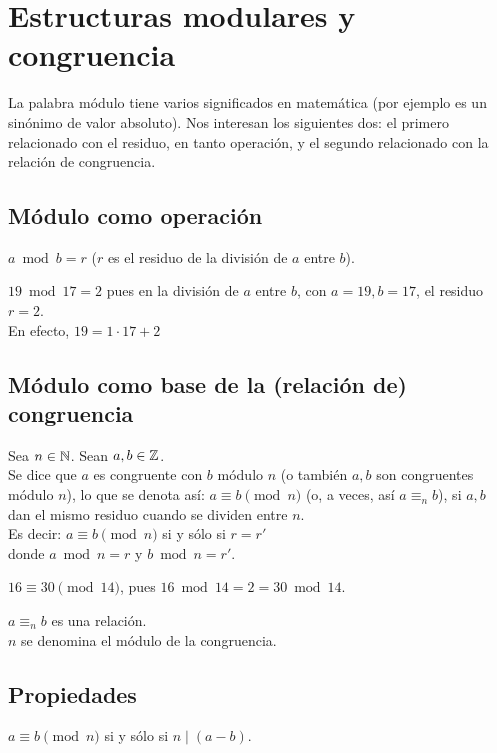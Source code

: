\section{Estructuras modulares y congruencia}
La palabra módulo tiene varios significados en matemática (por ejemplo es un sinónimo de valor absoluto).
Nos interesan los siguientes dos: el primero relacionado con el residuo, en tanto operación, y el segundo relacionado con la relación de congruencia.

\subsection{Módulo como operación}
$a \bmod b = r$ \; ($r$ es el residuo de la división de $a$ entre $b$). \\

\begin{ejemplo} $19 \bmod 17 = 2$ pues en la división de $a$ entre $b$, con $a = 19, b = 17$, el residuo $r = 2$. \\ En efecto, $19 = 1 \cdot 17 + 2$
\end{ejemplo}

\subsection{Módulo como base de la (relación de) congruencia}
Sea $n \in \mathbb{N}$. Sean $a,b \in \mathbb{Z}$. \\
Se dice que $a$ es congruente con $b$ módulo $n$ (o también $a,b$ son congruentes módulo $n$), lo que se denota así: $a \equiv b \pmod n$ (o, a veces, así $a \equiv_n b$), si  $a,b$ dan el mismo residuo cuando se dividen entre $n$. \\
Es decir: $a \equiv b \pmod n$  \; si y sólo si \;  $r = r'$ \\
donde $a \bmod n = r$ \; y \; $b \bmod n = r'$.

\begin{ejemplo} $16 \equiv 30 \pmod {14}$, pues $16 \bmod 14 = 2 = 30 \bmod 14$.
\end{ejemplo}

$a \equiv_n b$ es una relación. \\
$n$ se denomina el módulo de la congruencia.

\subsection{Propiedades}
\begin{enunciado} \label{enun:congrViaDivisib} $a \equiv b \pmod n$ si y sólo si $n \mid (a - b)$.
\end{enunciado}

